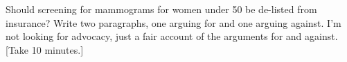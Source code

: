 Should screening for mammograms for women under 50 be de-listed from
insurance?  Write two paragraphs, one arguing for and one arguing
against.  I'm not looking for advocacy, just a fair account of the
arguments for and against. [Take 10 minutes.]

\TextEntry[itemname=dtk102]